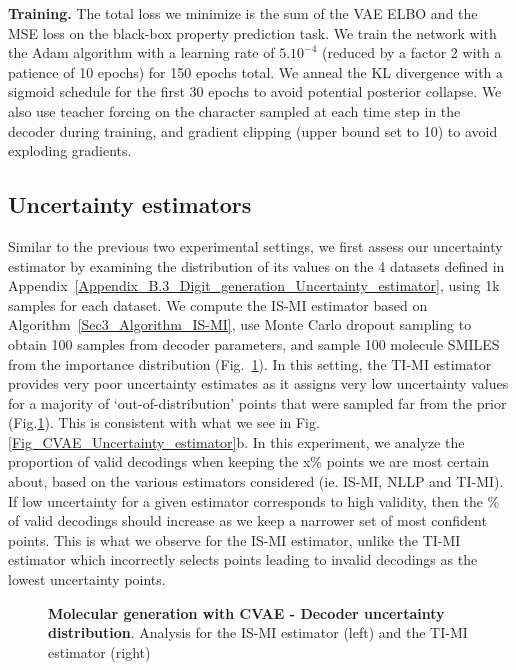 \textbf{Training. } The total loss we minimize is the sum of the VAE ELBO and the MSE loss on the black-box property prediction task.
We train the network with the Adam algorithm \cite{kingma2017adam} with a learning rate of $5.10^{-4}$ (reduced by a factor 2 with a patience of 10 epochs) for 150 epochs total. We anneal the KL divergence with a sigmoid schedule for the first 30 epochs to avoid potential posterior collapse.
We also use teacher forcing on the character sampled at each time step in the decoder during training, and gradient clipping (upper bound set to 10) to avoid exploding gradients.

\subsection{Uncertainty estimators}
\label{Appendix_D.3_Molecule_CVAE_Uncertainty_estimator}
Similar to the previous two experimental settings, we first assess our uncertainty estimator by examining the distribution of its values on the 4 datasets defined in Appendix~\ref{Appendix_B.3_Digit_generation_Uncertainty_estimator}, using 1k samples for each dataset. We compute the IS-MI estimator based on Algorithm~\ref{Sec3_Algorithm_IS-MI}, use Monte Carlo dropout sampling to obtain 100 samples from decoder parameters, and sample 100 molecule SMILES from the importance distribution (Fig.~\ref{Appendix_D_Fig_decoder_uncertainty_estimator}). In this setting, the TI-MI estimator provides very poor uncertainty estimates as it assigns very low uncertainty values for a majority of `out-of-distribution' points that were sampled far from the prior (Fig.\ref{Appendix_D_Fig_decoder_uncertainty_estimator}).
This is consistent with what we see in Fig.\ref{Fig_CVAE_Uncertainty_estimator}b. In this experiment, we analyze the proportion of valid decodings when keeping the x\% points we are most certain about, based on the various estimators considered (ie. IS-MI, NLLP and TI-MI). If low uncertainty for a given estimator corresponds to high validity, then the \% of valid decodings should increase as we keep a narrower set of most confident points. This is what we observe for the IS-MI estimator, unlike the TI-MI estimator which incorrectly selects points leading to invalid decodings as the lowest uncertainty points.

\begin{figure}[ht]
\vspace{0pt}
\hfill
{}
\caption{\textbf{Molecular generation with CVAE - Decoder uncertainty distribution}. Analysis for the IS-MI estimator (left) and the TI-MI estimator (right)}
\label{Appendix_D_Fig_decoder_uncertainty_estimator}
\end{figure}

